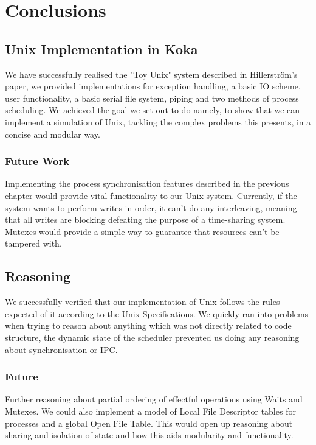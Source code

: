 \documentclass[logo,bsc,singlespacing,parskip]{infthesis}
\begin{document}
\chapter{Conclusions}

\section{Unix Implementation in Koka}
We have successfully realised the "Toy Unix" system described in Hillerström's paper, we provided implementations for exception handling, a basic IO scheme, user functionality, a basic serial file system, piping and two methods of process scheduling. We achieved the goal we set out to do namely, to show that we can implement a simulation of Unix, tackling the complex problems this presents, in a concise and modular way.

\subsection*{Future Work}
Implementing the process synchronisation features described in the previous chapter would provide vital functionality to our Unix system. Currently, if the system wants to perform writes in order, it can't do any interleaving, meaning that all writes are blocking defeating the purpose of a time-sharing system. Mutexes would provide a simple way to guarantee that resources can't be tampered with.

\section{Reasoning}
We successfully verified that our implementation of Unix follows the rules expected of it according to the Unix Specifications. We quickly ran into problems when trying to reason about anything which was not directly related to code structure, the dynamic state of the scheduler prevented us doing any reasoning about synchronisation or IPC.
\subsection*{Future}
Further reasoning about partial ordering of effectful operations using Waits and Mutexes. We could also implement a model of Local File Descriptor tables for processes and a global Open File Table. This would open up reasoning about sharing and isolation of state and how this aids modularity and functionality.  

% 


\end{document}
